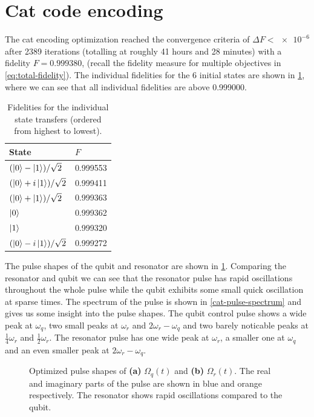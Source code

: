 \documentclass[main.tex]{subfiles}
\begin{document}
\clearpage{}
\section{Cat code encoding}
The cat encoding optimization reached the convergence criteria of \(\Delta F < \num{e-6}\) after 2389 iterations (totalling at roughly 41 hours and 28 minutes) with a fidelity \(F = 0.999380\), (recall the fidelity measure for multiple objectives in \cref{eq:total-fidelity}).
The individual fidelities for the 6 initial states are shown in \cref{tab:cat-fidelities}, where we can see that all individual fidelities are above 0.999000.

\begin{table}[H]
    \caption{Fidelities for the individual state transfers (ordered from highest to lowest).}%
    \label{tab:cat-fidelities}
    \centering
    \begin{tabular}{@{}ll@{}}
    \toprule
    State & \(F\)\\ \midrule
	\((\ket{0}-\ket{1})/\sqrt{2}\) & 0.999553 \\
	\((\ket{0}+i\ket{1})/\sqrt{2}\) & 0.999411 \\
	\((\ket{0}+\ket{1})/\sqrt{2}\) & 0.999363 \\
    \(\ket{0}\) & 0.999362 \\
	\(\ket{1}\) & 0.999320 \\
	\((\ket{0}-i\ket{1})/\sqrt{2}\) & 0.999272 \\
    \bottomrule
    \end{tabular}
\end{table}

The pulse shapes of the qubit and resonator are shown in \cref{fig:cat-pulse-shape}.
Comparing the resonator and qubit we can see that the resonator pulse has rapid oscillations throughout the whole pulse while the qubit exhibits some small quick oscillation at sparse times.
The spectrum of the pulse is shown in \cref{cat-pulse-spectrum} and gives us some insight into the pulse shapes.
The qubit control pulse shows a wide peak at \(\omega_q\), two small peaks at \(\omega_r\) and \(2\omega_r-\omega_q\) and two barely noticable peaks at \(\frac{1}{4}\omega_r\) and \(\frac{1}{2}\omega_r\). 
The resonator pulse has one wide peak at \(\omega_r\), a smaller one at \(\omega_q\) and an even smaller peak at \(2\omega_r-\omega_q\).

\begin{figure}[ht]
\centering
{}
\caption{%
Optimized pulse shapes of \textbf{(a)} \(\Omega_q(t)\) and \textbf{(b)} \(\Omega_r(t)\).
The real and imaginary parts of the pulse are shown in blue and orange respectively.
The resonator shows rapid oscillations compared to the qubit.
}%
\label{fig:cat-pulse-shape}
\end{figure}
\end{document}
